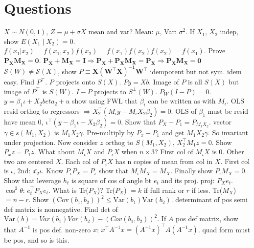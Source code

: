 \section{Questions}
\Q $X \sim N(0,1)$, $Z \equiv \mu + \sigma X$ mean and var? \A Mean: $\mu$, Var: $\sigma^2$.
\Q If $X_1$, $X_2$ indep, show $E(X_1 \mid X_2) = 0$.
\A $f(x_1 | x_2) = f(x_1,x_2)f(x_2) = f(x_1)f(x_2) f(x_2) = f(x_1)$.
\Q Prove $\mathbf{P_X M_X = 0}$.
\A $\mathbf{P_X + M_X = I \Rightarrow P_X + P_X M_X = P_X \Rightarrow P_X M_X = 0}$
\Q $\mathcal{S}(W) \neq \mathcal{S}(X)$, show $P \equiv \mathbf{X(W^{\top}X)^{-1}W^{\top}}$ idempotent but not sym.
\A idem easy.
Find $P^\top$.
$P$ projects onto $S(X)$.
$Py = Xb$.
Image of $P$ is all $S(X)$ but image of $P^{\top}$ is $S(W)$.
$I - P$ projects to $S^{\perp}(W)$.
$ P_W(I-P) = 0$.
\Q $y = \beta_1 \iota + X_2 beta_2 + u$ show using FWL that $\beta_i$ can be written as \hdots with $M_{\iota}$.
\A OLS resid orthog to regressors $\Rightarrow X_2 ^{\top} (M_{\iota} y - M_{\iota} X_2 \beta_2 ) = 0$.
OLS of $\beta_1$ must be resid have mean 0, $\iota^{\top} (y-\beta_1 \iota - X_2 \beta_2 ) = 0$.
\Q Show that $P_X - P_1 = P_{M_1 X_2}$.
\A vector $\gamma \in s(M_1, X_2)$ is $M_1 X_2 \gamma$.
Pre-multiply by $P_x - P_1$ and get $M_1 X_2 \gamma$.
So invariant under projection.
Now consider $z$ orthog to $S(M_1, X_2)$, $X_2 ^{\top} M_1 z = 0$.
Show $P_x z = P_1 z$.
\Q What about $M_{\iota}X$ and $P_{\iota} X$ when $n \times 3$?
\A First col of $M_{\iota} X$ is 0.
Other two are centered $X$.
Each col of $P_{\iota} X$ has n copies of mean from col in $X$.
First col is $\iota$, 2nd: $\bar{x_2}\iota$.
Know $P_{\iota} P_X = P_{\iota}$ show that $M_{\iota} M_X = M_X$.
Finally show $P_{\iota}M_{X} = 0$.
\Q Show that leverage $h_t$ is square of cos of angle bt $e_t$ and its proj.
\A proj: $P_X e_t$.
$\cos^2 \theta$: $e_t ^{\top} P_X e_t$.
\Q What is Tr($P_X$)?
\A Tr($P_X$) $= k$ if full rank or $r$ if less.
Tr($M_X$) $= n - r$.
\Q Show $(\text{Cov}(b_1,b_2))^2 \leq \text{Var}(b_1) \text{Var}(b_2)$.
\A determinant of pos semi def matrix is nonnegative.
Find det of $\text{Var}(b) = Var(b_1)Var(b_2) - (Cov(b_1,b_2))^2$.
\Q If $A$ pos def matrix, show that $A^{-1}$ is pos def.
\A non-zero $x$: $x^{\top} A^{-1} x = (A^{-1}x)^{\top} A (A^{-1} x)$.
quad form must be pos, and so is this.


